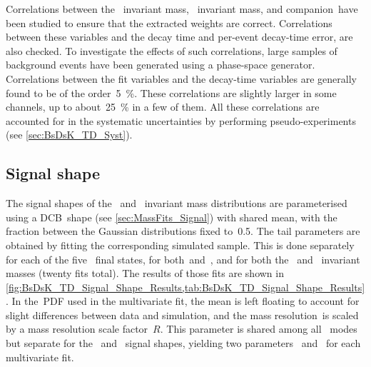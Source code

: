 Correlations between the \Bs~invariant mass, \Dsmp~invariant mass, and companion~\dllkpi have been studied to ensure that the extracted weights are correct.
Correlations between these variables and the decay time and per-event decay-time error, are also checked.
To investigate the effects of such correlations, large samples of background events have been generated using a phase-space generator.
Correlations between the fit variables and the decay-time variables are generally found to be of the order~\SI{5}{\percent}.
These correlations are slightly larger in some channels, up to about~\SI{25}{\percent} in a few of them.
All these correlations are accounted for in the systematic uncertainties by performing pseudo-experiments (see \cref{sec:BsDsK_TD_Syst}).

\subsection{Signal shape}

The signal shapes of the \Bs~and \Dsmp~invariant mass distributions are parameterised using a DCB~shape (see \cref{sec:MassFits_Signal}) with shared mean, with the fraction between the Gaussian distributions fixed to~\num{0.5}.
The tail parameters are obtained by fitting the corresponding simulated sample.
This is done separately for each of the five \Dsmp~final states, for both~\BsDsPi and~\BsDsK, and for both the \Bs~and \Dsmp~invariant masses (twenty fits total).
The results of those fits are shown in \cref{fig:BsDsK_TD_Signal_Shape_Results,tab:BsDsK_TD_Signal_Shape_Results}.
In the~PDF used in the multivariate fit, the mean is left floating to account for slight differences between data and simulation, and the mass resolution~\DCBs is scaled by a mass resolution scale factor~\(R\).
This parameter is shared among all \Dsmp~modes but separate for the \Bs~and \Dsmp~signal shapes, yielding two parameters \RBs~and \RDs~for each multivariate fit.

